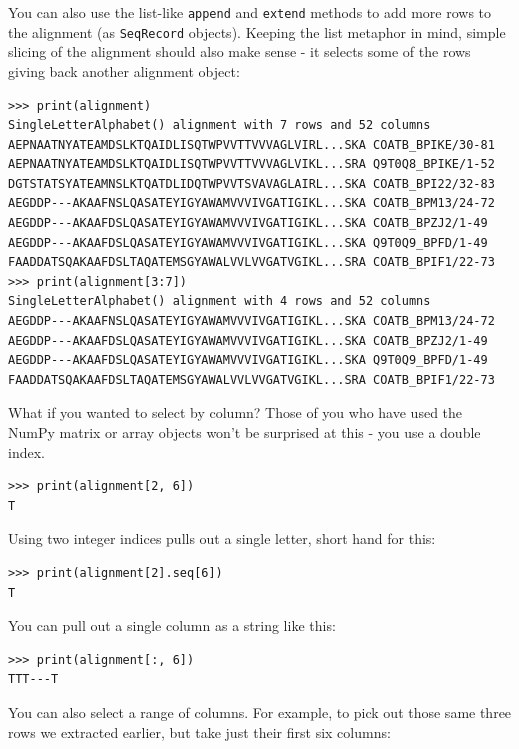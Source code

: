 \documentclass{report}
\begin{document}
You can also use the list-like \verb|append| and \verb|extend| methods to add
more rows to the alignment (as \verb|SeqRecord| objects). Keeping the list
metaphor in mind, simple slicing of the alignment should also make sense -
it selects some of the rows giving back another alignment object:

\begin{verbatim}
>>> print(alignment)
SingleLetterAlphabet() alignment with 7 rows and 52 columns
AEPNAATNYATEAMDSLKTQAIDLISQTWPVVTTVVVAGLVIRL...SKA COATB_BPIKE/30-81
AEPNAATNYATEAMDSLKTQAIDLISQTWPVVTTVVVAGLVIKL...SRA Q9T0Q8_BPIKE/1-52
DGTSTATSYATEAMNSLKTQATDLIDQTWPVVTSVAVAGLAIRL...SKA COATB_BPI22/32-83
AEGDDP---AKAAFNSLQASATEYIGYAWAMVVVIVGATIGIKL...SKA COATB_BPM13/24-72
AEGDDP---AKAAFDSLQASATEYIGYAWAMVVVIVGATIGIKL...SKA COATB_BPZJ2/1-49
AEGDDP---AKAAFDSLQASATEYIGYAWAMVVVIVGATIGIKL...SKA Q9T0Q9_BPFD/1-49
FAADDATSQAKAAFDSLTAQATEMSGYAWALVVLVVGATVGIKL...SRA COATB_BPIF1/22-73
>>> print(alignment[3:7])
SingleLetterAlphabet() alignment with 4 rows and 52 columns
AEGDDP---AKAAFNSLQASATEYIGYAWAMVVVIVGATIGIKL...SKA COATB_BPM13/24-72
AEGDDP---AKAAFDSLQASATEYIGYAWAMVVVIVGATIGIKL...SKA COATB_BPZJ2/1-49
AEGDDP---AKAAFDSLQASATEYIGYAWAMVVVIVGATIGIKL...SKA Q9T0Q9_BPFD/1-49
FAADDATSQAKAAFDSLTAQATEMSGYAWALVVLVVGATVGIKL...SRA COATB_BPIF1/22-73
\end{verbatim}

What if you wanted to select by column? Those of you who have used the NumPy
matrix or array objects won't be surprised at this - you use a double index.

\begin{verbatim}
>>> print(alignment[2, 6])
T
\end{verbatim}

\noindent Using two integer indices pulls out a single letter, short hand for this:

\begin{verbatim}
>>> print(alignment[2].seq[6])
T
\end{verbatim}

You can pull out a single column as a string like this:

\begin{verbatim}
>>> print(alignment[:, 6])
TTT---T
\end{verbatim}

You can also select a range of columns. For example, to pick out those same
three rows we extracted earlier, but take just their first six columns:
\end{document}
